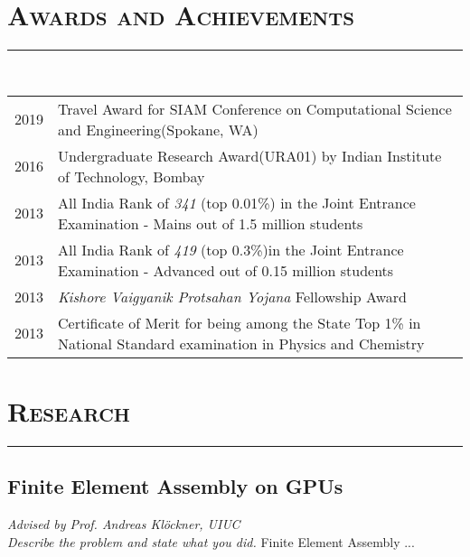 \documentclass[letterpaper, 12pt]{article}
\begin{document}


\section*{\Large\textsc{Awards and Achievements}}
\vspace{-4ex}
\rule{\textwidth}{0.1ex}
\vspace{1ex}\\
\begin{tabular}{p{} p{}}
2019    &   Travel Award for SIAM Conference on Computational Science and Engineering(Spokane, WA) \vspace{1ex}\\
2016    &   Undergraduate Research Award(URA01) by Indian Institute of Technology, Bombay \vspace{1ex}\\
2013    &   All India Rank of \textit{341} (top 0.01\%) in the Joint Entrance Examination - Mains out of 1.5 million students \vspace{1ex} \\
2013    &   All India Rank of \textit{419} (top 0.3\%)in the Joint Entrance Examination - Advanced out of 0.15 million students\vspace{1ex} \\
2013    &   \textit{Kishore Vaigyanik Protsahan Yojana} Fellowship Award\vspace{1ex} \\
2013    &   Certificate of Merit for being among the State Top 1\% in National Standard examination in Physics and Chemistry \\
\end{tabular} 



\section*{\Large\textsc{Research}}
\vspace{-4ex}
\rule{\textwidth}{0.1ex}


\subsection*{Finite Element Assembly on GPUs}
\vspace{-1ex}
\small \textit{Advised by Prof. Andreas Kl\"{o}ckner, UIUC}\\
\textit{Describe the problem and state what you did.}
Finite Element Assembly ...
\end{document}
